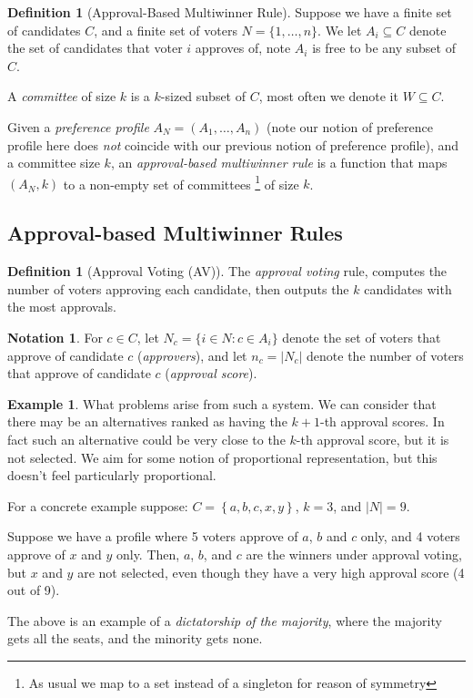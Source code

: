 \documentclass{book}
\theoremstyle{plain}
\theoremstyle{definition}
\newtheorem{definition}[theorem]{Definition}
\newtheorem{example}[theorem]{Example}
\newtheorem{notation}[theorem]{Notation}
\theoremstyle{remark}
\newcommand{\set}[1]{\left\{#1\right\}}
\begin{document}
\begin{definition}[Approval-Based Multiwinner Rule]
    Suppose we have a finite set of candidates $C$, 
    and a finite set of voters $N = \{1, \dots, n\}$. 
    We let 
    $A_i \subseteq C$ denote the set of candidates that voter $i$ approves of, 
    note $A_i$ is free to be any subset of $C$.

    A \emph{committee} of size $k$ is a $k$-sized subset of 
    $C$, most often we denote it $W \subseteq C$.

    Given a \emph{preference profile} 
    $A_N = (A_1, \dots, A_n)$
    (note our notion of preference profile here does \emph{not}
    coincide with our previous notion of preference profile),
    and a committee size $k$, an \emph{approval-based multiwinner rule} is a function
    that maps $(A_N, k)$ to a non-empty set of committees
    \footnote{As usual we map to a set instead of a singleton for reason of symmetry}
    of size $k$.
\end{definition}

\subsection{Approval-based Multiwinner Rules}

\begin{definition}[Approval Voting (AV)]
    The \emph{approval voting} rule,
    computes the number of voters approving each candidate,
    then outputs the $k$ candidates with the most approvals.
\end{definition}

\begin{notation}
    For $c \in C$, let 
    $N_c = \{i \in N : c \in A_i\}$ denote the set of voters that approve of candidate $c$ (\emph{approvers}), 
    and let $n_c = |N_c|$ denote the number of voters that approve of candidate $c$ (\emph{approval score}).
\end{notation}

\begin{example}
    What problems arise from such a system.
    We can consider that there may be an alternatives ranked 
    as having the $k + 1$-th approval scores. In fact such an alternative could be 
    very close to the $k$-th approval score, but it is not selected.
    We aim for some notion of proportional representation, but this 
    doesn't feel particularly proportional.

    For a concrete example suppose:
    $C = \set{a, b, c, x, y}$, $k = 3$, and $|N| = 9$.

    Suppose we have a profile where 
    5 voters approve of $a$, $b$ and $c$ only,
    and 4 voters approve of $x$ and $y$ only.
    Then, $a$, $b$, and $c$ are the winners under approval voting, but
    $x$ and $y$ are not selected, even though they have a very high
    approval score (4 out of 9).

    The above is an example of a 
    \emph{dictatorship of the majority}, where the majority gets all the seats, and the minority gets none.
\end{example}
\end{document}
